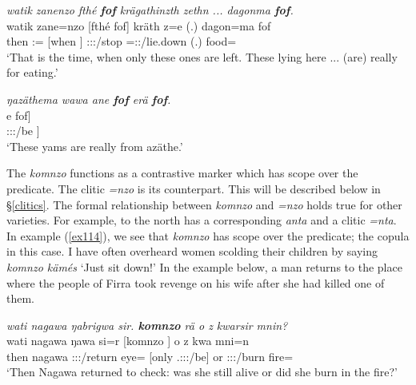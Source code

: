 \begin{exe}
	\ex \emph{watik zanenzo fthé \textbf{fof} krägathinzth zethn ... dagonma \textbf{fof}.}\\
	\gll watik zane=nzo [fthé fof] kräth z=e (.) dagon=ma fof\\
	then \Dem{}:\Prox{}=\Only{} [when \Emph{}] \Stpl:\Sbj:\Irr:\Pfv/stop \Prox=\Stpl\Sbj:\Nonpast:\Stat/lie.down (.) food=\Char{} \Emph{}\\
	\trans `That is the time, when only these ones are left. These lying here ... (are) really for eating.'
	\label{ex112}
\end{exe}
\begin{exe}
	\ex \emph{ŋazäthema wawa ane \textbf{fof} erä \textbf{fof}.}\\
	\gll [ŋazäthe=ma [wawa ane fof] e fof]\\
	[ŋazäthe=\Char{} [yam \Dem{} \Emph{}] \Stpl:\Sbj:\Nonpast:\Ipfv/be \Emph{}]\\
	\trans `These yams are really from \NG{}azäthe.'
	\label{ex113}
\end{exe}

The  \emph{komnzo} functions as a contrastive  marker which has scope over the predicate. The clitic \emph{=nzo} is its  counterpart. This will be described below in \S{}\ref{clitics}. The formal relationship between \emph{komnzo} and \emph{=nzo} holds true for other  varieties. For example,  to the north has a corresponding  \emph{anta} and a clitic \emph{=nta}.\\

In example (\ref{ex114}), we see that \emph{komnzo} has scope over the predicate; the copula in this case. I have often overheard women scolding their children by saying \emph{komnzo kämés} `Just sit down!' In the example below, a man returns to the place where the people of Firra took revenge on his wife after she had killed one of them.

\begin{exe}
	\ex	\emph{wati nagawa ŋabrigwa sir. \textbf{komnzo} rä o z kwarsir mnin?}\\
	\gll wati nagawa ŋawa si=r [komnzo ] o z kwa mni=n\\
	then nagawa \Stsg:\Sbj:\Pst:\Ipfv/return eye=\Purp{} [only \Tsg.\F:\Sbj:\Nonpast:\Ipfv/be] or \Iam{} \Stsg:\Sbj:\Rpst:\Ipfv/burn fire=\Loc{}\\
	\trans `Then Nagawa returned to check: was she still alive or did she burn in the fire?'
	\label{ex114}
\end{exe}

